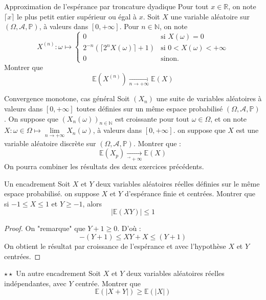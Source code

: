 \documentclass[french,a4paper]{article}
\renewcommand{\P}{\mathbb{P}}
\newcommand{\N}{\mathbb{N}}
\newcommand{\R}{\mathbb{R}}
\newcommand{\E}{\mathbb{E}}
\theoremstyle{plain}
\theoremstyle{definition}
\theoremstyle{remark}
\begin{document}
\begin{ex}{Approximation de l'espérance par troncature dyadique}
	Pour tout $x\in\R$, on note $\lceil x\rceil$ le plus petit entier supérieur ou égal à $x$. Soit $X$ une variable aléatoire sur $(\Omega,\mathcal{A},\P)$, à valeurs dans $[0,+\infty]$. Pour $n\in\N$, on note $$X^{(n)}:\omega\mapsto\begin{cases}
		0&\text{si }X(\omega)=0\\
		2^{-n}(\lceil 2^nX(\omega)\rceil+1)&\text{si }0<X(\omega)<+\infty \\
		0&\text{sinon.}
	\end{cases}$$ Montrer que $$\E(X^{(n)})\xrightarrow[n\to+\infty]{}\E(X)$$
\end{ex}

\begin{ex}{Convergence monotone, cas général}
	Soit $(X_n)$ une suite de variables aléatoires à valeurs dans $[0,+\infty]$ toutes définies sur un même espace probabilisé $(\Omega,\mathcal{A},\P)$. On suppose que $(X_n(\omega))_{n\in\N}$ est croissante pour tout $\omega\in\Omega$, et on note $X:\omega\in\Omega\mapsto\displaystyle\underset{n\to+\infty}{\lim}X_n(\omega)$, à valeurs dans $[0,+\infty]$. on suppose que $X$ est une variable aléatoire discrète sur $(\Omega,\mathcal{A},\P)$. Montrer que : $$\E(X_p)\xrightarrow[^\to+\infty]{}\E(X)$$ On pourra combiner les résultats des deux exercices précédents.
\end{ex}

\begin{ex}{Un encadrement}
	Soit $X$ et $Y$ deux variables aléatoires réelles définies sur le même espace probabilisé. on suppose $X$ et $Y$ d'espérance finie et centrées. Montrer que si $-1\leqslant X\leqslant 1$ et $Y\geqslant -1$, alors $$\lvert\E(XY)\rvert\leqslant 1$$
\end{ex}
\begin{proof}
	On "remarque" que $Y+1\geqslant 0$. D'où : $$-(Y+1)\leqslant XY +X\leqslant (Y+1)$$ On obtient le résultat par croissance de l'espérance et avec l'hypothèse $X$ et $Y$ centrées.
\end{proof}

\begin{ex}{$\star\star$ Un autre encadrement}
	Soit $X$ et $Y$ deux variables aléatoires réelles indépendantes, avec $Y$ centrée. Montrer que $$\E(\lvert X+Y\rvert)\geqslant\E(\lvert X\rvert)$$
\end{ex}
\end{document}
